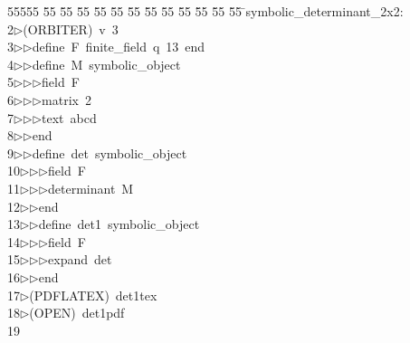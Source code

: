 %
%
\begin{tabbing}
55555 \= 55 \= 55 \= 55 \= 55 \= 55 \= 55 \= 55 \= 55 \= 55 \= 55 \= 55 \= 55 \= \>symbolic\_determinant\_2x2:\\[0pt]
2\>$\triangleright$\>(ORBITER)\ v\ 3\ \\[0pt]
3\>$\triangleright$\>$\triangleright$\>define\ F\ finite\_field\ q\ 13\ end\ \\[0pt]
4\>$\triangleright$\>$\triangleright$\>define\ M\ symbolic\_object\ \\[0pt]
5\>$\triangleright$\>$\triangleright$\>$\triangleright$\>field\ F\ \\[0pt]
6\>$\triangleright$\>$\triangleright$\>$\triangleright$\>matrix\ 2\ \\[0pt]
7\>$\triangleright$\>$\triangleright$\>$\triangleright$\>text\ abcd\ \\[0pt]
8\>$\triangleright$\>$\triangleright$\>end\ \\[0pt]
9\>$\triangleright$\>$\triangleright$\>define\ det\ symbolic\_object\ \\[0pt]
10\>$\triangleright$\>$\triangleright$\>$\triangleright$\>field\ F\ \\[0pt]
11\>$\triangleright$\>$\triangleright$\>$\triangleright$\>determinant\ M\ \\[0pt]
12\>$\triangleright$\>$\triangleright$\>end\ \\[0pt]
13\>$\triangleright$\>$\triangleright$\>define\ det1\ symbolic\_object\ \\[0pt]
14\>$\triangleright$\>$\triangleright$\>$\triangleright$\>field\ F\ \\[0pt]
15\>$\triangleright$\>$\triangleright$\>$\triangleright$\>expand\ det\ \\[0pt]
16\>$\triangleright$\>$\triangleright$\>end\\[0pt]
17\>$\triangleright$\>(PDFLATEX)\ det1tex\\[0pt]
18\>$\triangleright$\>(OPEN)\ det1pdf\\[0pt]
19\>\end{tabbing}
